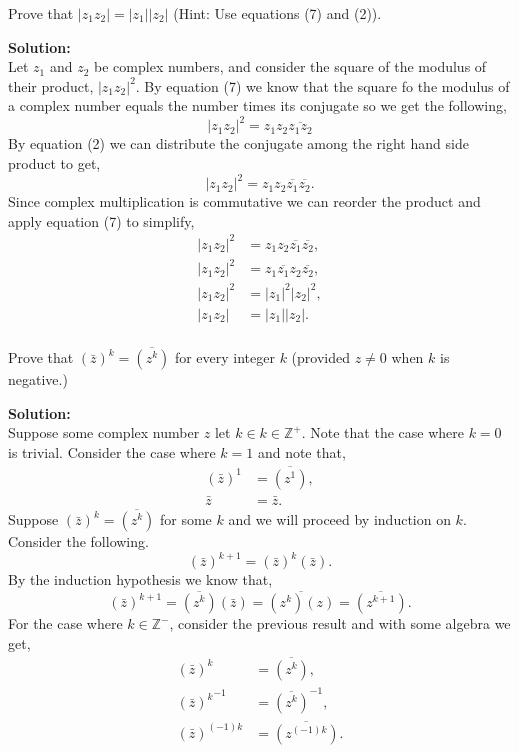 \documentclass[12pt]{article}
\makeatletter
\theoremstyle{homework}
\newenvironment{exercise}[1]
{\def\@currentlabel{#1}\exercisecore}
{\endexercisecore}
\newcommand{\localhead}[1]{\par\smallskip\noindent\textbf{#1}\nobreak\\}%
\newcommand\solution{\localhead{Solution:}}
\makeatother
\begin{document}
\begin{exercise}{14} Prove that $|z_1z_2| = |z_1||z_2|$ (Hint: Use equations (7) and (2)).\\
    \solution Let $z_1$ and $z_2$ be complex numbers, and consider the square of the modulus of their product, $|z_1z_2|^2$.
    By equation (7) we know that the square fo the modulus of a complex number equals the number times its conjugate so we get the following, 
    \begin{equation*}
        |z_1z_2|^2 = z_1z_2 \overline{z_1z_2}
    \end{equation*}
    By equation (2) we can distribute the conjugate among the right hand side product to get, 
    \begin{equation*}
        |z_1z_2|^2 = z_1z_2 \overline{z_1}\overline{z_2}.
    \end{equation*}
    Since complex multiplication is commutative we can reorder the product and apply equation (7) to simplify, 
    \begin{align*}
        |z_1z_2|^2 &= z_1z_2 \overline{z_1}\overline{z_2},\\
        |z_1z_2|^2 &= z_1\overline{z_1} z_2\overline{z_2},\\
        |z_1z_2|^2 &= |z_1|^2|z_2|^2,\\
        |z_1z_2| &= |z_1||z_2|.\\
    \end{align*}
\end{exercise}

\begin{exercise}{15} Prove that $(\bar{z})^k = \overline{(z^k)}$ for every integer $k$ (provided $z \neq 0$ when $k$ is negative.)\\
    \solution Suppose some complex number $z$ let $k \in k \in \mathbb{Z}^+$. Note that the case where $k = 0$ is trivial. Consider the case where $k = 1$ and note that, 
    \begin{align*}
        (\bar{z})^1 &= \overline{(z^1)},\\
        \bar{z} &= \bar{z}. 
    \end{align*}
    Suppose  $(\bar{z})^k = \overline{(z^k)}$ for some $k$ and we will proceed by induction on $k$. Consider the following. 
    \begin{equation*}
        (\bar{z})^{k+1} = (\bar{z})^k(\bar{z}).
    \end{equation*}
    By the induction hypothesis we know that,
    \begin{equation*}
        (\bar{z})^{k+1} = \overline{(z^k)}(\bar{z}) =  \overline{(z^k)(z)} = \overline{(z^{k+1})}.
    \end{equation*}
    For the case where $k \in \mathbb{Z}^-$, consider the previous result and with some algebra we get,
    \begin{align*}
        (\bar{z})^k &= \overline{(z^k)},\\
        {(\bar{z})^{k}}^{-1} &= {\overline{(z^{k})}}^{-1},\\
        (\bar{z})^{(-1)k} &= \overline{(z^{(-1)k})}.
    \end{align*}
\end{exercise}
\end{document}
